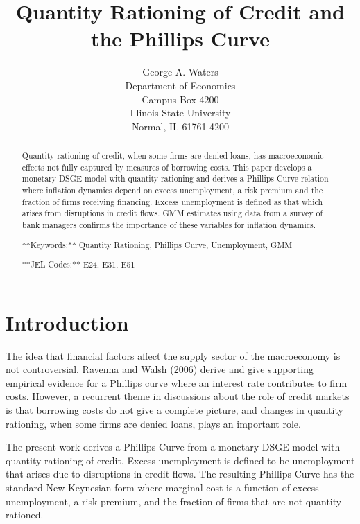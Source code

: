 \documentclass{article}
\begin{document}
\title{Quantity Rationing of Credit and the Phillips Curve}
\author{George A. Waters \\
Department of Economics\\
Campus Box 4200\\
Illinois State University\\
Normal, IL 61761-4200}
\maketitle

\begin{abstract}
Quantity rationing of credit, when some firms are denied loans, has
macroeconomic effects not fully captured by measures of borrowing costs.
This paper develops a monetary DSGE model with quantity rationing and
derives a Phillips Curve relation where inflation dynamics depend on excess
unemployment, a risk premium and the fraction of firms receiving financing.
Excess unemployment is defined as that which arises from disruptions in
credit flows. GMM estimates using data from a survey of bank managers
confirms the importance of these variables for inflation dynamics.

**Keywords:** Quantity Rationing, Phillips Curve, Unemployment, GMM

**JEL Codes:** E24, E31, E51
\end{abstract}

\pagebreak

\section{Introduction}

The idea that financial factors affect the supply sector of the macroeconomy
is not controversial. Ravenna and Walsh (2006) derive and give supporting
empirical evidence for a Phillips curve where an interest rate contributes
to firm costs. However, a recurrent theme in discussions about the role of
credit markets is that borrowing costs do not give a complete picture, and
changes in quantity rationing, when some firms are denied loans, plays an
important role.

The present work derives a Phillips Curve from a monetary DSGE model with
quantity rationing of credit. Excess unemployment is defined to be
unemployment that arises due to disruptions in credit flows. The resulting
Phillips Curve has the standard New Keynesian form where marginal cost is a
function of excess unemployment, a risk premium, and the fraction of firms
that are not quantity rationed.
\end{document}
